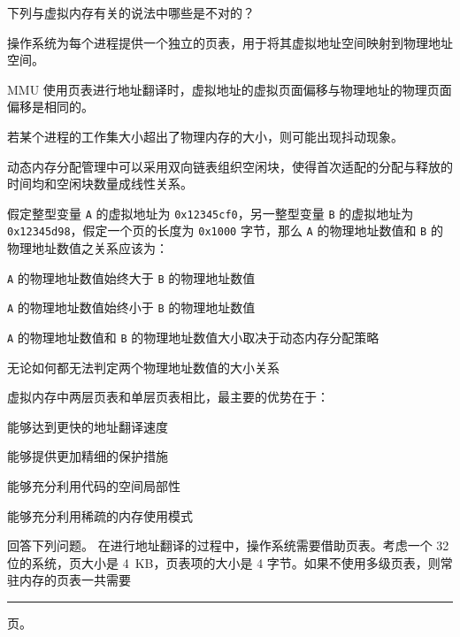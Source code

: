 \begin{problems}
         下列与虚拟内存有关的说法中哪些是不对的？
        \begin{choices}
            \item 操作系统为每个进程提供一个独立的页表，用于将其虚拟地址空间映射到物理地址空间。
            \item MMU 使用页表进行地址翻译时，虚拟地址的虚拟页面偏移与物理地址的物理页面偏移是相同的。
            \item 若某个进程的工作集大小超出了物理内存的大小，则可能出现抖动现象。
            \item 动态内存分配管理中可以采用双向链表组织空闲块，使得首次适配的分配与释放的时间均和空闲块数量成线性关系。
        \end{choices}
         假定整型变量 \verb|A| 的虚拟地址为 \verb|0x12345cf0|，另一整型变量 \verb|B| 的虚拟地址为 \verb|0x12345d98|，假定一个页的长度为 \verb|0x1000| 字节，那么 \verb|A| 的物理地址数值和 \verb|B| 的物理地址数值之关系应该为：
        \begin{choices}
            \item \verb|A| 的物理地址数值始终大于 \verb|B| 的物理地址数值
            \item \verb|A| 的物理地址数值始终小于 \verb|B| 的物理地址数值
            \item \verb|A| 的物理地址数值和 \verb|B| 的物理地址数值大小取决于动态内存分配策略
            \item 无论如何都无法判定两个物理地址数值的大小关系
        \end{choices}
         虚拟内存中两层页表和单层页表相比，最主要的优势在于：
        \begin{choices}
            \item 能够达到更快的地址翻译速度
            \item 能够提供更加精细的保护措施
            \item 能够充分利用代码的空间局部性
            \item 能够充分利用稀疏的内存使用模式
        \end{choices}
         回答下列问题。
        \qn 在进行地址翻译的过程中，操作系统需要借助页表。考虑一个 32 位的系统，页大小是 \SI{4}{KB}，页表项的大小是 4 字节。如果不使用多级页表，则常驻内存的页表一共需要 \rule{2.5cm}{0.25mm} 页。


\end{problems}
